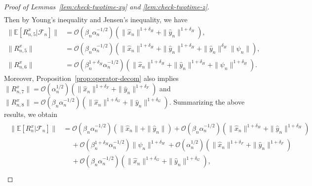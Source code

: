 \documentclass[11pt]{article}
\theoremstyle{plain}
\theoremstyle{definition}
\def\LGx{{L}_{G,x}}
\def\LGy{{L}_{G,y}}
\def\Hsmooth{{\delta_H}}
\def\Fsmooth{{\delta_F}}
\def\Gsmooth{{\delta_G}}
\def\FM{{\mathcal F}}
\def\OM{{\mathcal O}}
\def\EB{{\mathbb E}}
\newcommand{\xhat}{{\hat{x}}}
\newcommand{\yhat}{{\hat{y}}}
\newcommand{\xx}{{x}}
\newcommand{\yy}{{y}}
\begin{document}
\begin{appendix}
\begin{proof}[Proof of Lemmas~\ref{lem:check-twotime-xy} and \ref{lem:check-twotime-z}]
\begin{align*}
\end{align*}
Then by Young's inequality and Jensen's inequality, we have
\begin{align*}
    \| \EB[  R_{n,5}^x  | \FM_n ] \| & = \OM (\beta_{n} \alpha_{n}^{-1/2}) ( \| \xhat_{n} \|^{1+\Hsmooth} + \| \yhat_{n} \|^{1+\Hsmooth} ), \\
    \| R_{n,5}^x \| 
    & = \OM (\beta_{n} \alpha_{n}^{-1/2}) ( \| \xhat_{n} \|^{1+\Hsmooth} + \| \yhat_{n} \|^{1+\Hsmooth} + \| \yhat_{n} \|^\Hsmooth \| \psi_{n} \| ), \\
    \| R_{n,6}^x \| 
    & = \OM (\beta_{n}^{1+\Hsmooth} \alpha_{n}^{-1/2}) ( \| \xhat_{n} \|^{1+\Hsmooth} + \| \yhat_{n} \|^{1+\Hsmooth} + \| \psi_{n} \|^{1+\Hsmooth}  ).
\end{align*}
Moreover, Proposition~\ref{prop:operator-decom} also implies $\| R_{n,7}^x \| 
= \OM(\alpha_{n}^{1/2}) ( \| \xhat_{n} \|^{1+\Fsmooth} + \| \yhat_{n} \|^{1+\Fsmooth} )$ and 
$ \| R_{n,8}^x \| 
= \OM (\beta_{n} \alpha_{n}^{-1/2}) ( \| \xhat_{n} \|^{1+\Gsmooth} + \| \yhat_{n} \|^{1+\Gsmooth} ) $.
Summarizing the above results, we obtain
\begin{align}\label{eq:lem:check-twotime:Rx-upper}
    \begin{split}
        \| \EB [ R_{n}^x | \FM_n ] \|
        & = \OM( \beta_{n} \alpha_{n}^{-1/2})  (\| \xhat_{n} \| + \| \yhat_{n} \| ) + \OM (\beta_{n} \alpha_{n}^{-1/2}) ( \| \xhat_{n} \|^{1+\Hsmooth} + \| \yhat_{n} \|^{1+\Hsmooth} ) \\
        & \quad \ + \OM (\beta_{n}^{1+\Hsmooth} \alpha_{n}^{-1/2}) \| \psi_{n} \|^{1+\Hsmooth} + \OM(\alpha_{n}^{1/2}) ( \| \xhat_{n} \|^{1+\Fsmooth} + \| \yhat_{n} \|^{1+\Fsmooth} ) \\
        & \quad \ + \OM (\beta_{n} \alpha_{n}^{-1/2}) ( \| \xhat_{n} \|^{1+\Gsmooth} + \| \yhat_{n} \|^{1+\Gsmooth} ), \\

\end{split}
\end{align}
\end{proof}
\end{appendix}
\end{document}
